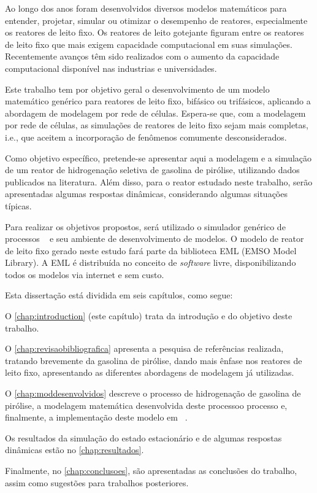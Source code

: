 Ao longo dos anos foram desenvolvidos diversos modelos matemáticos para
entender, projetar, simular ou otimizar o desempenho de reatores, especialmente
os reatores de leito fixo. Os reatores de leito gotejante figuram entre os
reatores de leito fixo que mais exigem capacidade computacional em suas
simulações. Recentemente avanços têm sido realizados com o aumento da capacidade
computacional disponível nas industrias e universidades.

Este trabalho tem por objetivo geral o desenvolvimento de um modelo
matemático genérico para reatores de leito fixo, bifásico ou trifásicos,
aplicando a abordagem de modelagem por rede de células. Espera-se que, com a modelagem por
rede de células, as simulações de reatores de leito fixo sejam mais completas,
i.e., que aceitem a incorporação de fenômenos comumente desconsiderados.

Como objetivo específico, pretende-se apresentar aqui a modelagem e a
simulação de um reator de hidrogenação seletiva de gasolina de pirólise,
utilizando dados publicados na literatura. Além disso, para o reator estudado
neste trabalho, serão apresentadas algumas respostas dinâmicas, considerando
algumas situações típicas.

Para realizar os objetivos propostos, será utilizado o simulador genérico de
processos \emso\ \cite{Soares2003} e seu ambiente de desenvolvimento de
modelos. O modelo de reator de leito fixo gerado neste estudo fará parte da
biblioteca EML (EMSO Model Library). A EML é distribuída no conceito de \emph{software} livre,
disponibilizando todos os modelos via internet e sem custo.

Esta dissertação está dividida em seis capítulos, como segue:

O \autoref{chap:introduction} (este capítulo) trata da introdução e do objetivo deste trabalho.

O \autoref{chap:revisaobibliografica} apresenta a pesquisa de referências
realizada, tratando brevemente da gasolina de pirólise, dando mais ênfase nos
reatores de leito fixo, apresentando as diferentes abordagens de modelagem
já utilizadas.

O \autoref{chap:moddesenvolvidos} descreve o processo de
hidrogenação de gasolina de pirólise, a modelagem matemática
desenvolvida deste processoo processo e, finalmente, a implementação
deste modelo em \emso\ .

Os resultados da simulação do estado estacionário e de algumas
respostas dinâmicas estão no \autoref{chap:resultados}.

Finalmente, no \autoref{chap:conclusoes}, são apresentadas as conclusões do
trabalho, assim como sugestões para trabalhos posteriores.
